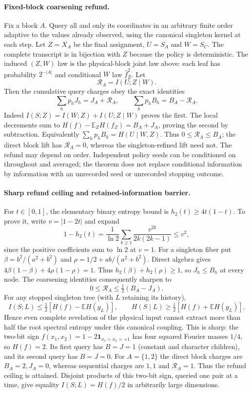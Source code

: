 \documentclass{article}
\begin{document}
\paragraph{Fixed-block coarsening refund.}
Fix a block $A$. Query all and only its coordinates in an arbitrary finite
order adaptive to the values already observed, using the canonical singleton
kernel at each step. Let $Z=X_A$ be the final assignment, $U=S_A$ and $W=S_C$.
The complete transcript is in bijection with $Z$ because the policy is
deterministic. The induced $(Z,W)$ law is the physical-block joint law above:
each leaf has probability $2^{-|A|}$ and conditional $W$ law $\widehat f_Z^2$.
Let
\[
 \mathcal R_A=I(U;Z\mid W).
\]
Then the cumulative query charges obey the exact identities
\[
 \boxed{\sum_h p_hJ_h=J_A+\mathcal R_A,\qquad
 \sum_h p_hB_h=B_A-\mathcal R_A.}
\]
Indeed $I(S;Z)=I(W;Z)+I(U;Z\mid W)$ proves the first. The local decrements
sum to $H(f)-\mathbb E_ZH(f_Z)=B_A+J_A$, proving the second by subtraction.
Equivalently $\sum_h p_h B_h=H(U\mid W,Z)$.
Thus $0\le\mathcal R_A\le B_A$; the direct block lift has $\mathcal R_A=0$,
whereas the singleton-refined lift need not. The refund may depend on order.
Independent policy seeds can be conditioned on throughout and averaged;
the theorem does not replace conditional information by information with an
unrecorded seed or unrecorded stopping outcome.

\paragraph{Sharp refund ceiling and retained-information barrier.}
For $t\in[0,1]$, the elementary binary entropy bound is
$h_2(t)\ge4t(1-t)$. To prove it, write $v=|1-2t|$ and expand
\[
 1-h_2(t)=\frac1{\ln2}\sum_{k\ge1}
       \frac{v^{2k}}{2k(2k-1)}\le v^2,
\]
since the positive coefficients sum to $\ln2$ at $v=1$.
For a singleton fiber put $\beta=b^2/(a^2+b^2)$ and
$\rho=1/2+ab/(a^2+b^2)$. Direct algebra gives
$4\beta(1-\beta)+4\rho(1-\rho)=1$. Thus
$h_2(\beta)+h_2(\rho)\ge1$, so $J_h\le B_h$ at every node.
The coarsening identities consequently sharpen to
\[
 \boxed{0\le\mathcal R_A\le\tfrac12(B_A-J_A).}
\]
For any stopped singleton tree (with $L$ retaining its history),
\[
 \boxed{I(S;L)\le\tfrac12[H(f)-\mathbb EH(g_L)],\qquad
 H(S\mid L)\ge\tfrac12[H(f)+\mathbb EH(g_L)].}
\]
Hence even complete revelation of the physical input cannot extract more
than half the root spectral entropy under this canonical coupling.
This is sharp: the two-bit sign $f(x_1,x_2)=1-2\mathbf1_{x_1=x_2=+1}$
has four squared Fourier masses $1/4$, so $H(f)=2$.
Its first query has $B=J=1$ (constant and character children), and its
second query has $B=J=0$. For $A=\{1,2\}$ the direct block charges are
$B_A=2,J_A=0$, whereas sequential charges are $1,1$ and
$\mathcal R_A=1$. Thus the refund ceiling is attained.
Disjoint products of this two-bit sign, queried one pair at a time,
give equality $I(S;L)=H(f)/2$ in arbitrarily large dimensions.
\end{document}
